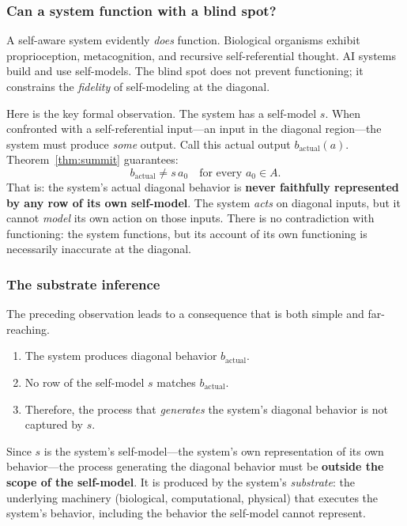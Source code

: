 \documentclass[11pt]{article}
\begin{document}
\subsubsection{Can a system function with a blind spot?}
\label{sec:functioning}

A self-aware system evidently \emph{does} function.  Biological
organisms exhibit proprioception, metacognition, and recursive
self-referential thought.  AI systems build and use self-models.
The blind spot does not prevent functioning; it constrains the
\emph{fidelity} of self-modeling at the diagonal.

Here is the key formal observation.  The system has a self-model
$s$.  When confronted with a self-referential input---an input in
the diagonal region---the system must produce \emph{some} output.
Call this actual output $b_{\mathrm{actual}}(a)$.  Theorem~\ref{thm:summit}
guarantees:
\[
  b_{\mathrm{actual}} \neq s\,a_0 \quad\text{for every } a_0 \in A.
\]
That is: the system's actual diagonal behavior is \textbf{never
faithfully represented by any row of its own self-model}.  The system
\emph{acts} on diagonal inputs, but it cannot \emph{model} its own
action on those inputs.  There is no contradiction with functioning:
the system functions, but its account of its own functioning is
necessarily inaccurate at the diagonal.

\subsubsection{The substrate inference}
\label{sec:substrate-inference}

The preceding observation leads to a consequence that is both simple
and far-reaching.

\begin{enumerate}[label=(\arabic*)]
\item The system produces diagonal behavior $b_{\mathrm{actual}}$.
\item No row of the self-model $s$ matches $b_{\mathrm{actual}}$.
\item Therefore, the process that \emph{generates} the system's
  diagonal behavior is not captured by $s$.
\end{enumerate}

\noindent
Since $s$ is the system's self-model---the system's own representation
of its own behavior---the process generating the diagonal behavior
must be \textbf{outside the scope of the self-model}.  It is produced
by the system's \emph{substrate}: the underlying machinery
(biological, computational, physical) that executes the system's
behavior, including the behavior the self-model cannot represent.
\end{document}
